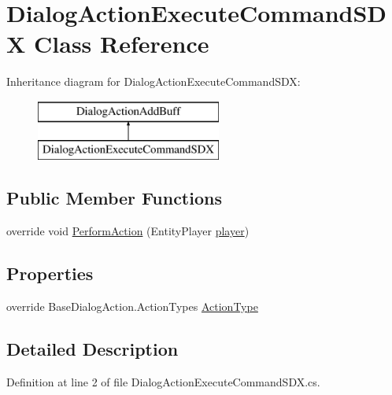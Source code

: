 \hypertarget{class_dialog_action_execute_command_s_d_x}{}\section{Dialog\+Action\+Execute\+Command\+S\+DX Class Reference}
\label{class_dialog_action_execute_command_s_d_x}
Inheritance diagram for Dialog\+Action\+Execute\+Command\+S\+DX\+:\begin{figure}[H]
\begin{center}
\leavevmode
\includegraphics[height=2.000000cm]{db/d3c/class_dialog_action_execute_command_s_d_x}
\end{center}
\end{figure}
\subsection*{Public Member Functions}
\begin{DoxyCompactItemize}
\item 
override void \mbox{\hyperlink{class_dialog_action_execute_command_s_d_x_a97c8e46376e72ed90822f68886dd52ba}{Perform\+Action}} (Entity\+Player \mbox{\hyperlink{_sphere_i_i_01_music_01_boxes_2_config_2_localization_8txt_a4e2cb8aeff651600ea1cc57fe5a929a4}{player}})
\end{DoxyCompactItemize}
\subsection*{Properties}
\begin{DoxyCompactItemize}
\item 
override Base\+Dialog\+Action.\+Action\+Types \mbox{\hyperlink{class_dialog_action_execute_command_s_d_x_ad7651451453eaace529347a8f1a61213}{Action\+Type}}
\end{DoxyCompactItemize}


\subsection{Detailed Description}


Definition at line 2 of file Dialog\+Action\+Execute\+Command\+S\+D\+X.\+cs.



